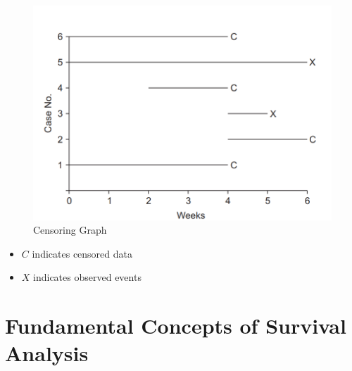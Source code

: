 \documentclass[doublespacing]{report} [12px]%
\begin{document}
\begin{figure}[H]
    \centering
    \includegraphics[width=0.5\linewidth]{Figure 3/3.2.png}
    \caption{Censoring Graph}
    \label{Figure 3.2}
\end{figure}


\begin{itemize}

\item \(C\) indicates censored data
\item  \(X\) indicates observed events


\end{itemize}



\section{Fundamental Concepts of Survival Analysis}
\end{document}
